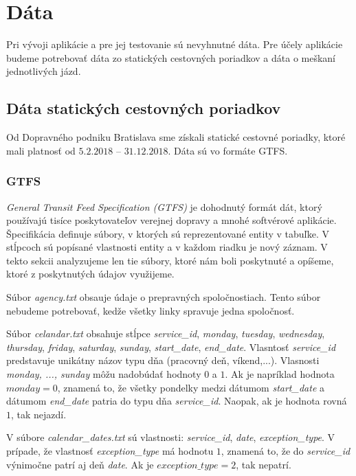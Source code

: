 \section{Dáta}
Pri vývoji aplikácie a pre jej testovanie sú nevyhnutné dáta. Pre účely aplikácie budeme potrebovať dáta zo statických cestovných poriadkov a dáta o meškaní jednotlivých jázd. 

\subsection{Dáta statických cestovných poriadkov}
Od Dopravného podniku Bratislava sme získali statické cestovné poriadky, ktoré mali platnosť od $5.2.2018$ – $31.12.2018$. Dáta sú vo formáte GTFS. 

\subsubsection{GTFS}
\textit{General Transit Feed Specification (GTFS)} je dohodnutý formát dát, ktorý používajú tisíce poskytovateľov verejnej dopravy a mnohé softvérové aplikácie. Špecifikácia definuje súbory, v ktorých sú reprezentované entity v tabuľke. V stĺpcoch sú popísané vlastnosti entity a v každom riadku je nový záznam. V tekto sekcii analyzujeme len tie súbory, ktoré nám boli poskytnuté a opíšeme, ktoré z poskytnutých údajov využijeme.

Súbor \textit{agency.txt} obsauje údaje o prepravných spoločnostiach. Tento súbor nebudeme potrebovať, kedže všetky linky spravuje jedna spoločnosť. 

Súbor \textit{celandar.txt} obsahuje stĺpce \textit{service\_id}, \textit{monday}, \textit{tuesday}, \textit{wednesday}, \textit{thursday}, \textit{friday}, \textit{saturday}, \textit{sunday}, \textit{start\_date}, \textit{end\_date}. Vlasntosť \textit{service\_id} predstavuje unikátny názov typu dňa (pracovný deň, víkend,...). Vlasnosti \textit{monday, ..., sunday} môžu nadobúdať hodnoty $0$ a $1$. Ak je napríklad hodnota $monday = 0$, znamená to, že všetky pondelky medzi dátumom \textit{start\_date} a dátumom \textit{end\_date} patria do typu dňa \textit{service\_id}. Naopak, ak je hodnota rovná $1$, tak nejazdí. 

V súbore \textit{calendar\_dates.txt} sú vlastnosti: \textit{service\_id}, \textit{date}, \textit{exception\_type}. V prípade, že vlastnosť \textit{exception\_type} má hodnotu $1$, znamená to, že do \textit{service\_id} výnimočne patrí aj deň \textit{date}. Ak je $exception\_type = 2$, tak nepatrí.

